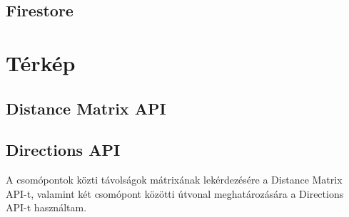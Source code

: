 \subsection{Firestore}


\section{Térkép}\label{sec:ALAP:szerkeszt}

\subsection{Distance Matrix API}



\subsection{Directions API}

A csomópontok közti távolságok mátrixának lekérdezésére a Distance Matrix API-t, valamint két csomópont közötti útvonal meghatározására a Directions API-t használtam.


